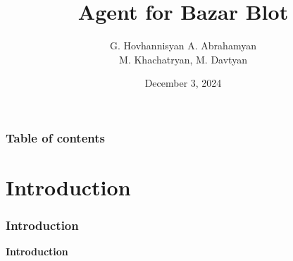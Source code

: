 \documentclass{beamer}
\begin{document}
\title{Agent for Bazar Blot}
\author{G. Hovhannisyan  A. Abrahamyan\\
M. Khachatryan, M. Davtyan}
\date{December 3, 2024}


\begin{frame}
\titlepage
\end{frame}

\begin{frame}\frametitle{Table of contents}\tableofcontents
\end{frame}


\section{Introduction}
\begin{frame}\frametitle{Introduction}
    \begin{center}
        \textbf{Introduction}
    \end{center}
\end{frame}
\end{document}
